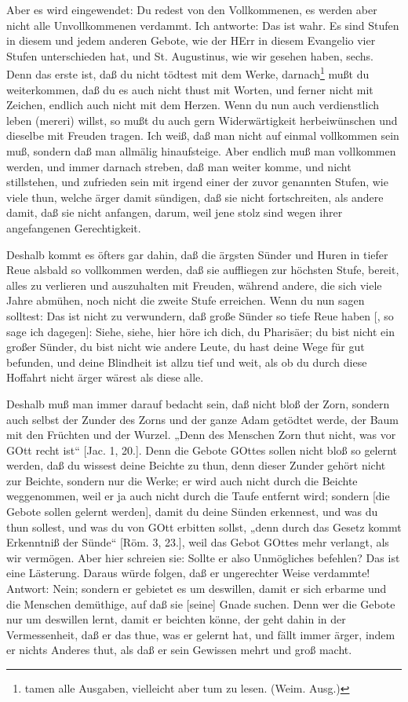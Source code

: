 Aber es wird eingewendet: Du redest von den Vollkommenen, es werden aber nicht alle Unvollkommenen verdammt. Ich antworte: Das ist wahr. Es sind Stufen in diesem und jedem anderen Gebote, wie der HErr in diesem Evangelio vier Stufen unterschieden hat, und St. Augustinus, wie wir gesehen haben, sechs. Denn das erste ist, daß du nicht tödtest mit dem Werke,
darnach\footnote{tamen alle Ausgaben, vielleicht aber tum zu lesen. (Weim. Ausg.)} mußt du weiterkommen, daß du es auch nicht thust mit Worten, und ferner nicht mit Zeichen, endlich auch nicht mit dem Herzen. Wenn du nun auch verdienstlich leben (mereri) willst, so mußt du auch gern Widerwärtigkeit herbeiwünschen und dieselbe mit Freuden tragen. Ich weiß, daß man nicht auf einmal vollkommen sein muß, sondern daß man allmälig hinaufsteige. Aber endlich muß man vollkommen werden, und immer darnach streben, daß man weiter komme, und nicht stillstehen, und zufrieden sein mit irgend einer der zuvor genannten Stufen, wie viele thun, welche ärger damit sündigen, daß sie nicht fortschreiten, als andere damit, daß sie nicht anfangen, darum, weil jene stolz sind wegen ihrer angefangenen Gerechtigkeit.

Deshalb kommt es öfters gar dahin, daß die ärgsten Sünder und Huren in tiefer Reue alsbald so vollkommen werden, daß sie auffliegen zur höchsten Stufe, bereit, alles zu verlieren und auszuhalten mit Freuden, während andere, die sich viele Jahre abmühen, noch nicht die zweite Stufe erreichen. Wenn du nun sagen solltest: Das ist nicht zu verwundern, daß große Sünder so tiefe Reue haben [, so sage ich dagegen]: Siehe, siehe, hier höre ich dich, du Pharisäer; du bist nicht ein großer Sünder, du bist nicht wie andere Leute, du hast deine Wege für gut befunden, und deine Blindheit ist allzu tief und weit, als ob du durch diese Hoffahrt nicht ärger wärest als diese alle.

Deshalb muß man immer darauf bedacht sein, daß nicht bloß der Zorn, sondern auch selbst der Zunder des Zorns und der ganze Adam getödtet werde, der Baum mit den Früchten und der Wurzel. „Denn des Menschen Zorn thut nicht, was vor GOtt recht ist“ [Jac. 1, 20.]. Denn die Gebote GOttes sollen nicht bloß so gelernt werden, daß du wissest deine Beichte zu thun, denn dieser Zunder gehört nicht zur Beichte, sondern nur die Werke; er wird auch nicht durch die Beichte weggenommen, weil er ja auch nicht durch die Taufe entfernt wird; sondern [die Gebote sollen gelernt werden], damit du deine Sünden erkennest, und was du thun sollest, und was du von GOtt erbitten sollst, „denn durch das Gesetz kommt Erkenntniß der Sünde“ [Röm. 3, 23.], weil das Gebot GOttes mehr verlangt, als wir vermögen. Aber hier schreien sie: Sollte er also Unmögliches befehlen? Das ist eine Lästerung. Daraus würde folgen, daß er ungerechter Weise verdammte! Antwort: Nein; sondern er gebietet es um deswillen, damit er sich erbarme und die Menschen demüthige, auf daß sie [seine] Gnade suchen. Denn wer die Gebote nur um deswillen lernt, damit er beichten könne, der geht dahin in der Vermessenheit, daß er das thue, was er gelernt hat, und fällt immer ärger, indem er nichts Anderes thut, als daß er sein Gewissen mehrt und groß macht.

